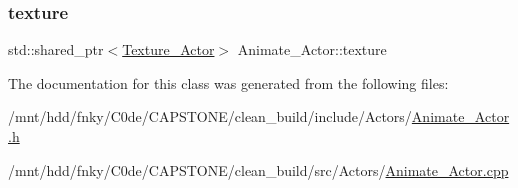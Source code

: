 \mbox{\label{classAnimate__Actor_a48a940cb5632d01a6aedd57ed3a0d992}} 
\subsubsection{\texorpdfstring{texture}{texture}}
{\footnotesize\ttfamily std\+::shared\+\_\+ptr$<$\hyperlink{classTexture__Actor}{Texture\+\_\+\+Actor}$>$ Animate\+\_\+\+Actor\+::texture\hspace{0.3cm}{\ttfamily [private]}}



The documentation for this class was generated from the following files\+:\begin{DoxyCompactItemize}
\item 
/mnt/hdd/fnky/\+C0de/\+C\+A\+P\+S\+T\+O\+N\+E/clean\+\_\+build/include/\+Actors/\hyperlink{Animate__Actor_8h}{Animate\+\_\+\+Actor.\+h}\item 
/mnt/hdd/fnky/\+C0de/\+C\+A\+P\+S\+T\+O\+N\+E/clean\+\_\+build/src/\+Actors/\hyperlink{Animate__Actor_8cpp}{Animate\+\_\+\+Actor.\+cpp}\end{DoxyCompactItemize}
